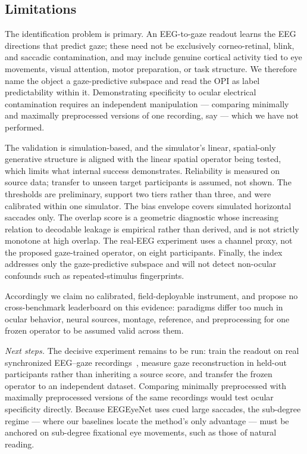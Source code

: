 \documentclass[conference]{IEEEtran}
\begin{document}
\subsection{Limitations}\label{sec:limits}

The identification problem is primary. An EEG-to-gaze readout learns the EEG directions that
predict gaze; these need not be exclusively corneo-retinal, blink, and saccadic contamination,
and may include genuine cortical activity tied to eye movements, visual attention, motor
preparation, or task structure. We therefore name the object a gaze-predictive subspace and read
the OPI as label predictability within it. Demonstrating specificity to ocular electrical
contamination requires an independent manipulation --- comparing minimally and maximally
preprocessed versions of one recording, say --- which we have not performed.

The validation is simulation-based, and the simulator's linear, spatial-only generative structure
is aligned with the linear spatial operator being tested, which limits what internal success
demonstrates. Reliability is measured on source data; transfer to unseen target participants is
assumed, not shown. The thresholds are preliminary, support two tiers rather than three, and
were calibrated within one simulator. The bias envelope covers simulated horizontal saccades
only. The overlap score is a geometric diagnostic whose increasing relation to decodable leakage
is empirical rather than derived, and is not strictly monotone at high overlap. The real-EEG experiment uses a channel proxy, not the proposed
gaze-trained operator, on eight participants. Finally, the index addresses only the
gaze-predictive subspace and will not detect non-ocular confounds such as repeated-stimulus
fingerprints.

Accordingly we claim no calibrated, field-deployable instrument, and propose no cross-benchmark
leaderboard on this evidence: paradigms differ too much in ocular behavior, neural sources,
montage, reference, and preprocessing for one frozen operator to be assumed valid across them.

\emph{Next steps.} The decisive experiment remains to be run: train the readout on real
synchronized EEG--gaze recordings~\cite{kastrati2021eegeyenet,hollenstein2018zuco}, measure gaze
reconstruction in held-out participants rather than inheriting a source score, and transfer the
frozen operator to an independent dataset. Comparing minimally preprocessed with
maximally preprocessed versions of the same recordings would test ocular specificity directly.
Because EEGEyeNet uses cued large saccades, the sub-degree regime --- where our baselines locate
the method's only advantage --- must be anchored on sub-degree
fixational eye movements, such as those of natural reading.
\end{document}
